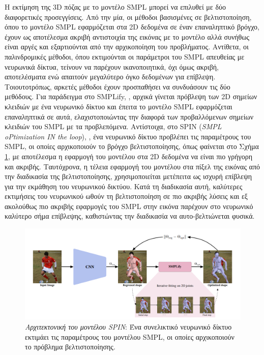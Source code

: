 Η εκτίμηση της 3D πόζας με το μοντέλο SMPL μπορεί να επιλυθεί με δύο διαφορετικές προσεγγίσεις. Από την μία, οι μέθοδοι βασισμένες σε βελτιστοποίηση, όπου το μοντέλο SMPL εφαρμόζεται στα 2D δεδομένα σε έναν επαναληπτικό βρόγχο, έχουν ως αποτέλεσμα ακριβή αντιστοιχία της εικόνας με το μοντέλο αλλά συνήθως είναι αργές και εξαρτιούνται από την αρχικοποίηση του προβλήματος. Αντίθετα, οι παλινδρομικές μέθοδοι, όπου εκτιμούνται οι παράμετροι του SMPL απευθείας με νευρωνικά δίκτυα, τείνουν να παρέχουν ικανοποιητικά, όχι όμως ακριβή, αποτελέσματα ενώ απαιτούν μεγαλύτερο όγκο δεδομένων για επίβλεψη. Τοιουτοτρόπως, αρκετές μέθοδοι έχουν προσπαθήσει να συνδυάσουν τις δύο μεθόδους. Για παράδειγμα στο SMPLify, \cite{keep_it_smpl_paper}, αρχικά γίνεται πρόβλεψη των 2D σημείων κλειδιών με ένα νευρωνικό δίκτυο και έπειτα το μοντέλο SMPL εφαρμόζεται επαναληπτικά σε αυτά, ελαχιστοποιώντας την διαφορά των προβαλλόμενων σημείων κλειδιών του SMPL με τα προβλεπόμενα. Αντίστοιχα, στο SPIN (\textsl{SMPL oPtimization IN the loop}), \cite{spin_paper}, ένα νευρωνικό δίκτυο προβλέπει τις παραμέτρους του SMPL, οι οποίες αρχικοποιούν το βρόγχο βελτιστοποίησης, όπως φαίνεται στο Σχήμα \ref{fig:spin_architecture}, με αποτέλεσμα η εφαρμογή του μοντέλου στα 2D δεδομένα να είναι πιο γρήγορη και ακριβής. Ταυτόχρονα, η τέλεια εφαρμογή του μοντέλου στα πίξελ της εικόνας από την διαδικασία της βελτιστοποίησης, χρησιμοποιείται μετέπειτα ως ισχυρή επίβλεψη για την εκμάθηση του νευρωνικού δικτύου. Κατά τη διαδικασία αυτή, καλύτερες εκτιμήσεις του νευρωνικού ωθούν τη βελτιστοποίηση σε πιο ακριβής λύσεις και εξ ακολούθως πιο ακριβής εφαρμογές του SMPL στην εικόνα παρέχουν στο νευρωνικό καλύτερο σήμα επίβλεψης, καθιστώντας την διαδικασία να αυτο-βελτιώνεται φυσικά.

 \begin{figure}[h!]
	\centering
	\includegraphics[scale=0.4]{images/chapter2/3d_pose_estimation/spin_architecture.png}
	\caption[Αρχιτεκτονική του μοντέλου SPIN]{\textsl{Αρχιτεκτονική του μοντέλου SPIN}: Ένα συνελικτικό νευρωνικό δίκτυο εκτιμάει τις παραμέτρους του μοντέλου SMPL, οι οποίες αρχικοποιούν το πρόβλημα βελτιστοποίησης.}
	\label{fig:spin_architecture}
\end{figure}


